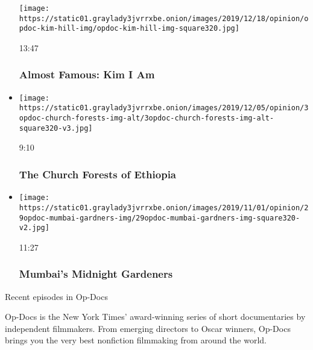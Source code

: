 \begin{itemize}
  \texttt{[image: https://static01.graylady3jvrrxbe.onion/images/2019/12/18/opinion/opdoc-kim-hill-img/opdoc-kim-hill-img-square320.jpg]}

  13:47

  \hypertarget{almost-famous-kim-i-am}{%
  \subsubsection{Almost Famous: Kim I Am}\label{almost-famous-kim-i-am}}
\item
  \href{https://www.nytimes3xbfgragh.onion/video/opinion/100000006808736/the-church-forests-of-ethiopia.html?action=click\&module=video-series-bar\&region=header\&pgtype=Article\&playlistId=video/op-docs}{}

  \texttt{[image: https://static01.graylady3jvrrxbe.onion/images/2019/12/05/opinion/3opdoc-church-forests-img-alt/3opdoc-church-forests-img-alt-square320-v3.jpg]}

  9:10

  \hypertarget{the-church-forests-of-ethiopia}{%
  \subsubsection{The Church Forests of
  Ethiopia}\label{the-church-forests-of-ethiopia}}
\item
  \href{https://www.nytimes3xbfgragh.onion/video/opinion/100000006616228/mumbais-midnight-gardeners.html?action=click\&module=video-series-bar\&region=header\&pgtype=Article\&playlistId=video/op-docs}{}

  \texttt{[image: https://static01.graylady3jvrrxbe.onion/images/2019/11/01/opinion/29opdoc-mumbai-gardners-img/29opdoc-mumbai-gardners-img-square320-v2.jpg]}

  11:27

  \hypertarget{mumbais-midnight-gardeners}{%
  \subsubsection{Mumbai's Midnight
  Gardeners}\label{mumbais-midnight-gardeners}}
\end{itemize}

Recent episodes in Op-Docs

Op-Docs is the New York Times' award-winning series of short
documentaries by independent filmmakers. From emerging directors to
Oscar winners, Op-Docs brings you the very best nonfiction filmmaking
from around the world.

